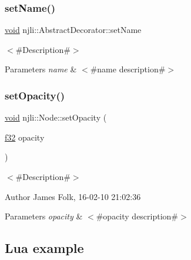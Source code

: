 \begin{DoxyCodeInclude}
\end{DoxyCodeInclude}
\mbox{\label{classnjli_1_1_node_a087eb5f8d9f51cc476f12f1d10a3cb95}} 
\subsubsection{\texorpdfstring{set\+Name()}{setName()}}
{\footnotesize\ttfamily \mbox{\hyperlink{_thread_8h_af1e856da2e658414cb2456cb6f7ebc66}{void}} njli\+::\+Abstract\+Decorator\+::set\+Name}

$<$\#\+Description\#$>$


\begin{DoxyParams}{Parameters}
{\em name} & $<$\#name description\#$>$ \\
\hline
\end{DoxyParams}
\mbox{\label{classnjli_1_1_node_a6ce7d73fab5d4d42fe3be0edb00898f0}} 
\subsubsection{\texorpdfstring{set\+Opacity()}{setOpacity()}}
{\footnotesize\ttfamily \mbox{\hyperlink{_thread_8h_af1e856da2e658414cb2456cb6f7ebc66}{void}} njli\+::\+Node\+::set\+Opacity (\begin{DoxyParamCaption}\item[{\mbox{\hyperlink{_util_8h_a5f6906312a689f27d70e9d086649d3fd}{f32}}}]{opacity }\end{DoxyParamCaption})}



$<$\#\+Description\#$>$ 

\begin{DoxyAuthor}{Author}
James Folk, 16-\/02-\/10 21\+:02\+:36
\end{DoxyAuthor}

\begin{DoxyParams}{Parameters}
{\em opacity} & $<$\#opacity description\#$>$\\
\hline
\end{DoxyParams}
\hypertarget{classnjli_1_1_steering_behavior_wander_ex1}{}\subsection{Lua example}\label{classnjli_1_1_steering_behavior_wander_ex1}

